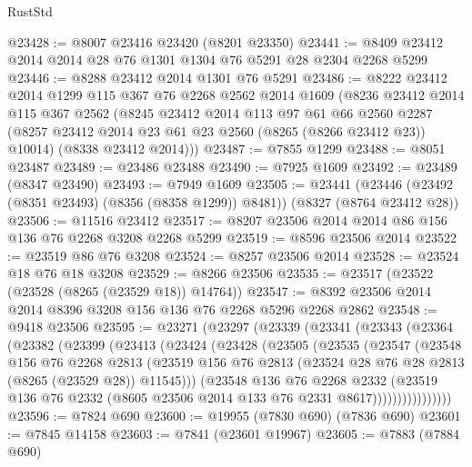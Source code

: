 \begin{lexlean}{RustStd}
\begin{coremodule}
@23428 := @8007 @23416 @23420 (@8201 @23350)
@23441 := @8409 @23412 @2014 @2014 @28 @76 @1301 @1304 @76 @5291 @28 @2304 @2268 @5299
@23446 := @8288 @23412 @2014 @1301 @76 @5291
@23486 := @8222
    @23412
    @2014
    @1299
    @115
    @367
    @76
    @2268
    @2562
    @2014
    @1609
    (@8236
      @23412
      @2014
      @115
      @367
      @2562
      (@8245
        @23412
        @2014
        @113
        @97
        @61
        @66
        @2560
        @2287
        (@8257 @23412 @2014 @23 @61 @23 @2560 (@8265 (@8266 @23412 @23)) @10014)
        (@8338 @23412 @2014)))
@23487 := @7855 @1299
@23488 := @8051 @23487
@23489 := @23486 @23488
@23490 := @7925 @1609
@23492 := @23489 (@8347 @23490)
@23493 := @7949 @1609
@23505 := @23441
    (@23446 (@23492 (@8351 @23493) (@8356 (@8358 @1299)) @8481))
    (@8327 (@8764 @23412 @28))
@23506 := @11516 @23412
@23517 := @8207 @23506 @2014 @2014 @86 @156 @136 @76 @2268 @3208 @2268 @5299
@23519 := @8596 @23506 @2014
@23522 := @23519 @86 @76 @3208
@23524 := @8257 @23506 @2014
@23528 := @23524 @18 @76 @18 @3208
@23529 := @8266 @23506
@23535 := @23517 (@23522 (@23528 (@8265 (@23529 @18)) @14764))
@23547 := @8392 @23506 @2014 @2014 @8396 @3208 @156 @136 @76 @2268 @5296 @2268 @2862
@23548 := @9418 @23506
@23595 := @23271
    (@23297
      (@23339
        (@23341
          (@23343
            (@23364
              (@23382
                (@23399
                  (@23413
                    (@23424
                      (@23428
                        (@23505
                          (@23535
                            (@23547
                              (@23548
                                @156
                                @76
                                @2268
                                @2813
                                (@23519
                                  @156
                                  @76
                                  @2813
                                  (@23524 @28 @76 @28 @2813 (@8265 (@23529 @28)) @11545)))
                              (@23548
                                @136
                                @76
                                @2268
                                @2332
                                (@23519
                                  @136
                                  @76
                                  @2332
                                  (@8605 @23506 @2014 @133 @76 @2331 @8617))))))))))))))))
@23596 := @7824 @690
@23600 := @19955 (@7830 @690) (@7836 @690)
@23601 := @7845 @14158
@23603 := @7841 (@23601 @19967)
@23605 := @7883 (@7884 @690)

\end{coremodule}
\end{lexlean}
